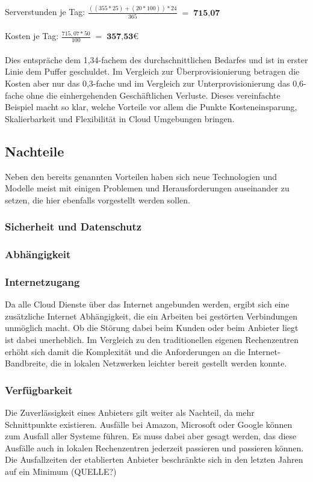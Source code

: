 \\
\\
Serverstunden je Tag:    $\displaystyle \frac{((355 * 25) + (20 * 100)) * 24}{365}\; =\; \textbf{715,07}	 $\\
\\
Kosten je Tag:           $\displaystyle \frac{715,07 * 50}{100}\; =\; \textbf{357,53€} $\\
\\
Dies entspräche dem 1,34-fachem des durchschnittlichen Bedarfes und ist in erster Linie dem Puffer geschuldet. Im Vergleich zur Überprovisionierung betragen die Kosten aber nur das 0,3-fache und im Vergleich zur Unterprovisionierung das 0,6-fache ohne die einhergehenden Geschäftlichen Verluste.
Dieses vereinfachte Beispiel macht so klar, welche Vorteile vor allem die Punkte Kosteneinsparung, Skalierbarkeit und Flexibilität in Cloud Umgebungen bringen.

\subsection{Nachteile}
Neben den bereits genannten Vorteilen haben sich neue Technologien und Modelle meist mit einigen Problemen und Herausforderungen auseinander zu setzen, die hier ebenfalls vorgestellt werden sollen.
\subsubsection{Sicherheit und Datenschutz}

\subsubsection{Abhängigkeit}

\subsubsection{Internetzugang}
Da alle Cloud Dienste über das Internet angebunden werden, ergibt sich eine zusätzliche Internet Abhängigkeit, die ein Arbeiten bei gestörten Verbindungen unmöglich macht. Ob die Störung dabei beim Kunden oder beim Anbieter liegt ist dabei unerheblich. Im Vergleich zu den traditionellen eigenen Rechenzentren erhöht sich damit die Komplexität und die Anforderungen an die Internet-Bandbreite, die in lokalen Netzwerken leichter bereit gestellt werden konnte.
\subsubsection{Verfügbarkeit}
Die Zuverlässigkeit eines Anbieters gilt weiter als Nachteil, da mehr Schnittpunkte existieren. Ausfälle bei Amazon, Microsoft oder Google können zum Ausfall aller Systeme führen. Es muss dabei aber gesagt werden, das diese Ausfälle auch in lokalen Rechenzentren jederzeit passieren und passieren können. Die Ausfallzeiten der etablierten Anbieter beschränkte sich in den letzten Jahren auf ein Minimum (QUELLE?)

